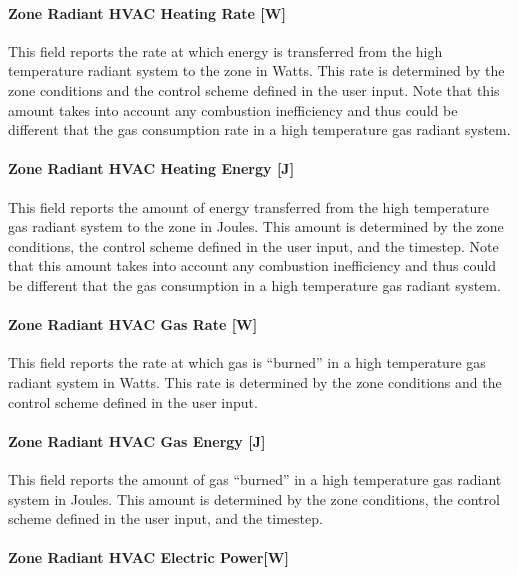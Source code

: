 \paragraph{Zone Radiant HVAC Heating Rate {[}W{]}}\label{zone-radiant-hvac-heating-rate-w-3}

This field reports the rate at which energy is transferred from the high temperature radiant system to the zone in Watts. This rate is determined by the zone conditions and the control scheme defined in the user input. Note that this amount takes into account any combustion inefficiency and thus could be different that the gas consumption rate in a high temperature gas radiant system.

\paragraph{Zone Radiant HVAC Heating Energy {[}J{]}}\label{zone-radiant-hvac-heating-energy-j-3}

This field reports the amount of energy transferred from the high temperature gas radiant system to the zone in Joules. This amount is determined by the zone conditions, the control scheme defined in the user input, and the timestep. Note that this amount takes into account any combustion inefficiency and thus could be different that the gas consumption in a high temperature gas radiant system.

\paragraph{Zone Radiant HVAC Gas Rate {[}W{]}}\label{zone-radiant-hvac-gas-rate-w}

This field reports the rate at which gas is ``burned'' in a high temperature gas radiant system in Watts. This rate is determined by the zone conditions and the control scheme defined in the user input.

\paragraph{Zone Radiant HVAC Gas Energy {[}J{]}}\label{zone-radiant-hvac-gas-energy-j}

This field reports the amount of gas ``burned'' in a high temperature gas radiant system in Joules. This amount is determined by the zone conditions, the control scheme defined in the user input, and the timestep.

\paragraph{Zone Radiant HVAC Electric Power{[}W{]}}\label{zone-radiant-hvac-electric-powerw}

